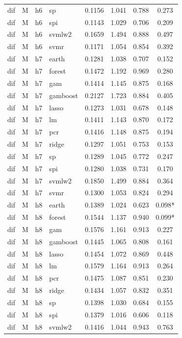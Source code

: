 \begin{ThreePartTable}
\begin{longtable}[t]{llclcccc}
dif & M & h6 & sp & 0.1156 & 1.041 & 0.788 & 0.273\\
dif & M & h6 & spi & 0.1143 & 1.029 & 0.706 & 0.209\\
dif & M & h6 & svmlw2 & 0.1659 & 1.494 & 0.888 & 0.497\\
dif & M & h6 & svmr & 0.1171 & 1.054 & 0.854 & 0.392\\
\addlinespace
dif & M & h7 & earth & 0.1281 & 1.038 & 0.707 & 0.152\\
dif & M & h7 & forest & 0.1472 & 1.192 & 0.969 & 0.280\\
dif & M & h7 & gam & 0.1414 & 1.145 & 0.875 & 0.168\\
dif & M & h7 & gamboost & 0.2127 & 1.723 & 0.884 & 0.405\\
dif & M & h7 & lasso & 0.1273 & 1.031 & 0.678 & 0.148\\
dif & M & h7 & lm & 0.1411 & 1.143 & 0.870 & 0.172\\
dif & M & h7 & pcr & 0.1416 & 1.148 & 0.875 & 0.194\\
dif & M & h7 & ridge & 0.1297 & 1.051 & 0.753 & 0.153\\
dif & M & h7 & sp & 0.1289 & 1.045 & 0.772 & 0.247\\
dif & M & h7 & spi & 0.1280 & 1.038 & 0.731 & 0.170\\
dif & M & h7 & svmlw2 & 0.1850 & 1.499 & 0.884 & 0.364\\
dif & M & h7 & svmr & 0.1300 & 1.053 & 0.824 & 0.294\\
\addlinespace
dif & M & h8 & earth & 0.1389 & 1.024 & 0.623 & 0.098*\\
dif & M & h8 & forest & 0.1544 & 1.137 & 0.940 & 0.099*\\
dif & M & h8 & gam & 0.1576 & 1.161 & 0.913 & 0.227\\
dif & M & h8 & gamboost & 0.1445 & 1.065 & 0.808 & 0.161\\
dif & M & h8 & lasso & 0.1454 & 1.072 & 0.869 & 0.448\\
dif & M & h8 & lm & 0.1579 & 1.164 & 0.913 & 0.264\\
dif & M & h8 & pcr & 0.1475 & 1.087 & 0.851 & 0.230\\
dif & M & h8 & ridge & 0.1434 & 1.057 & 0.832 & 0.351\\
dif & M & h8 & sp & 0.1398 & 1.030 & 0.684 & 0.155\\
dif & M & h8 & spi & 0.1379 & 1.016 & 0.606 & 0.118\\
dif & M & h8 & svmlw2 & 0.1416 & 1.044 & 0.943 & 0.763\\

\end{longtable}
\end{ThreePartTable}

